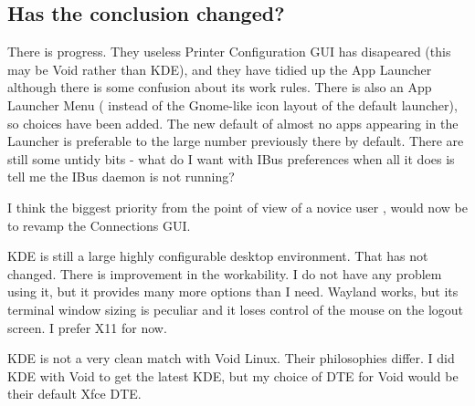\documentclass{article}  %
\begin{document}
\subsection{Has the conclusion changed?}
There is progress.  They useless Printer Configuration GUI has disapeared (this may be Void rather than KDE), and they have tidied up the App Launcher although there is some confusion about its work rules. There is also an App Launcher Menu ( instead of the Gnome-like icon layout of the default launcher), so choices have been added. The new default of almost no apps appearing in the Launcher is preferable to the large number previously there by default. There are still some untidy bits - what do I want with IBus preferences when all it does is tell me the IBus daemon is not running?

I think the biggest priority from the point of view of a novice user , would now be to revamp the Connections GUI. 

KDE is still a large highly configurable desktop environment. That has not changed. There is improvement in the workability.  I do not have any problem using it, but it provides many more options than I need.  
Wayland works, but its terminal window sizing is peculiar and it loses control of the mouse on the logout screen. I prefer X11 for now.

KDE is not a very clean match with Void Linux.  Their philosophies differ. I did KDE with Void to get the latest KDE, but my choice of DTE for Void would be their default Xfce DTE.
\end{document}
